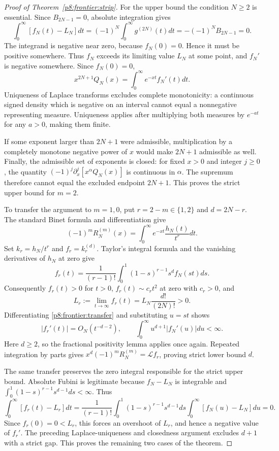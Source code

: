 \documentclass[11pt,a4paper]{article}
\theoremstyle{definition}
\theoremstyle{remark}
\numberwithin{equation}{section}
\begin{document}
\begin{proof}[Proof of Theorem~\ref{p8:frontier:strip}]
For the upper bound the condition $N\geq2$ is essential. Since
$B_{2N-1}=0$, absolute integration gives
\begin{equation}
 \int_0^\infty[f_N(t)-L_N]dt
 =(-1)^N\int_0^\infty g^{(2N)}(t)dt
 =-(-1)^NB_{2N-1}=0.
 \label{p8:frontier:zerointegral}
\end{equation}
The integrand is negative near zero, because $f_N(0)=0$. Hence it must
be positive somewhere. Thus $f_N$ exceeds its limiting value $L_N$ at
some point, and $f_N'$ is negative somewhere. Since $f_N(0)=0$,
\[
 x^{2N+1}Q_N(x)=\int_0^\infty e^{-xt}f_N'(t)dt.
\]
Uniqueness of Laplace transforms excludes complete monotonicity: a
continuous signed density which is negative on an interval cannot equal
a nonnegative representing measure. Uniqueness applies after multiplying
both measures by $e^{-at}$ for any $a>0$, making them finite.

If some exponent larger than $2N+1$ were admissible, multiplication by
a completely monotone negative power of $x$ would make $2N+1$
admissible as well. Finally, the admissible set of exponents is closed:
for fixed $x>0$ and integer $j\geq0$, the quantity
$(-1)^j\partial_x^j[x^\alpha Q_N(x)]$ is continuous in $\alpha$.
The supremum therefore cannot equal the excluded endpoint $2N+1$.
This proves the strict upper bound for $m=2$.

To transfer the argument to $m=1,0$, put $r=2-m\in\{1,2\}$ and
$d=2N-r$. The standard Binet formula and differentiation give
\[
 (-1)^mR_N^{(m)}(x)=\int_0^\infty e^{-xt}\frac{h_N(t)}{t^r}dt.
\]
Set $k_r=h_N/t^r$ and $f_r=k_r^{(d)}$. Taylor's integral formula
and the vanishing derivatives of $h_N$ at zero give
\begin{equation}
 f_r(t)=\frac1{(r-1)!}\int_0^1(1-s)^{r-1}s^d f_N(st)ds.
 \label{p8:frontier:transfer}
\end{equation}
Consequently $f_r(t)>0$ for $t>0$, $f_r(t)\sim c_rt^2$ at zero
with $c_r>0$, and
\[
 L_r:=\lim_{t\to\infty}f_r(t)=L_N\frac{d!}{(2N)!}>0.
\]
Differentiating \eqref{p8:frontier:transfer} and substituting $u=st$
shows
\[
 |f_r'(t)|=O_N(t^{-d-2}),\qquad
 \int_0^\infty u^{d+1}|f_N'(u)|du<\infty.
\]
Here $d\geq2$, so
the fractional positivity lemma applies once again. Repeated integration
by parts gives $x^d(-1)^mR_N^{(m)}=\mathcal Lf_r$, proving strict
lower bound $d$.

The same transfer preserves the zero integral responsible for the
strict upper bound. Absolute Fubini is legitimate because
$f_N-L_N$ is integrable and
$\int_0^1(1-s)^{r-1}s^{d-1}ds<\infty$. Thus
\[
 \int_0^\infty[f_r(t)-L_r]dt
 =\frac1{(r-1)!}\int_0^1(1-s)^{r-1}s^{d-1}ds
           \int_0^\infty[f_N(u)-L_N]du=0.
\]
Since $f_r(0)=0<L_r$, this forces an overshoot of $L_r$, and hence
a negative value of $f_r'$. The preceding Laplace-uniqueness and
closedness argument excludes $d+1$ with a strict gap. This proves
the remaining two cases of the theorem.
\end{proof}
\end{document}
